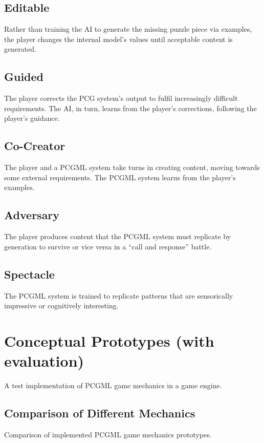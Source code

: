 \documentclass[MGS,Master,english]{twbook}%
\begin{document}
\subsection{Editable}
Rather than training the AI to generate the missing puzzle piece via examples, the player changes the internal model’s values until acceptable content is generated. \cite{pcgml::paper}

\subsection{Guided}
The player corrects the \ac{PCG} system’s output to fulfil increasingly difficult requirements. The \ac{AI}, in turn, learns from the player’s corrections, following the player’s guidance. \cite{pcgml::paper}

\subsection{Co-Creator}
The player and a \ac{PCGML} system take turns in creating content, moving towards some external requirements. The \ac{PCGML} system learns from the player’s examples. \cite{pcgml::paper} 

\subsection{Adversary}
The player produces content that the \ac{PCGML} system must replicate by generation to survive or vice versa in a “call and response” battle. \cite{pcgml::paper}

\subsection{Spectacle}
The \ac{PCGML} system is trained to replicate patterns that are sensorically impressive or cognitively interesting. \cite{pcgml::paper}

\section{Conceptual Prototypes (with evaluation)}
A test implementation of PCGML game mechanics in a game engine.

\subsection{Comparison of Different Mechanics}
Comparison of implemented PCGML game mechanics prototypes.
\end{document}
